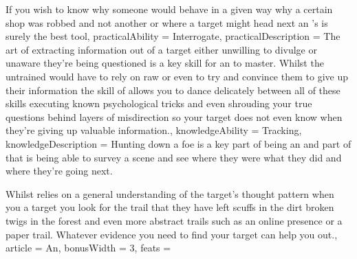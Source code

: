 {If you wish to know why someone would behave in a given way\comma{} why a certain shop was robbed and not another\comma{} or where a target might head next \minus{} an \name{}'s \imp{\innateAbility} is surely the best tool,
	practicalAbility = Interrogate,
	practicalDescription = The art of extracting information out of a target\comma{} either unwilling to divulge or unaware they're being questioned\comma{} is a key skill for an \bname{} to master.   Whilst the untrained would have to rely on raw \comma{} \comma{}  or even  to try and convince them to give up their information\comma{} the skill of  allows you to dance delicately between all of these skills\comma{} executing known psychological tricks and even shrouding your true questions behind layers of misdirection so your target does not even know when they're giving up valuable information.,
	knowledgeAbility = Tracking,
	knowledgeDescription = Hunting down a foe is a key part of being an \bname{}\comma{} and part of that is being able to survey a scene and see where they were\comma{} what they did\comma{} and where they're going next.

Whilst  relies on a general understanding of the target's thought pattern\comma{} when you  a target you look for the trail that they have left \minus{} scuffs in the dirt\comma{} broken twigs in the forest and even more abstract trails such as an online presence or a paper trail. Whatever evidence you need to find your target\comma{}  can help you out.,
	article = An,
	bonusWidth = 3, feats = \AurorFeats
}

